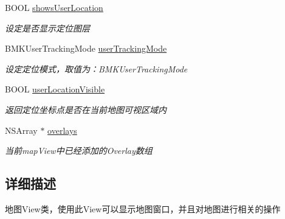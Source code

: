 \begin{DoxyCompactItemize}
\item 
\hypertarget{interface_b_m_k_map_view_a6e18e9532c42e940eca7739378348af4}{B\+O\+O\+L \hyperlink{interface_b_m_k_map_view_a6e18e9532c42e940eca7739378348af4}{shows\+User\+Location}}\label{interface_b_m_k_map_view_a6e18e9532c42e940eca7739378348af4}

\begin{DoxyCompactList}\small\item\em 设定是否显示定位图层 \end{DoxyCompactList}\item 
\hypertarget{interface_b_m_k_map_view_aac0adfff30441312452cef6844ef818b}{B\+M\+K\+User\+Tracking\+Mode \hyperlink{interface_b_m_k_map_view_aac0adfff30441312452cef6844ef818b}{user\+Tracking\+Mode}}\label{interface_b_m_k_map_view_aac0adfff30441312452cef6844ef818b}

\begin{DoxyCompactList}\small\item\em 设定定位模式，取值为：\+B\+M\+K\+User\+Tracking\+Mode \end{DoxyCompactList}\item 
\hypertarget{interface_b_m_k_map_view_ada9feb9e53eb9611b57a596c572bb280}{B\+O\+O\+L \hyperlink{interface_b_m_k_map_view_ada9feb9e53eb9611b57a596c572bb280}{user\+Location\+Visible}}\label{interface_b_m_k_map_view_ada9feb9e53eb9611b57a596c572bb280}

\begin{DoxyCompactList}\small\item\em 返回定位坐标点是否在当前地图可视区域内 \end{DoxyCompactList}\item 
\hypertarget{interface_b_m_k_map_view_a6c673c46ad9f146f80e48d82ebcf934b}{N\+S\+Array $\ast$ \hyperlink{interface_b_m_k_map_view_a6c673c46ad9f146f80e48d82ebcf934b}{overlays}}\label{interface_b_m_k_map_view_a6c673c46ad9f146f80e48d82ebcf934b}

\begin{DoxyCompactList}\small\item\em 当前map\+View中已经添加的\+Overlay数组 \end{DoxyCompactList}\end{DoxyCompactItemize}


\subsection{详细描述}
地图\+View类，使用此\+View可以显示地图窗口，并且对地图进行相关的操作 


